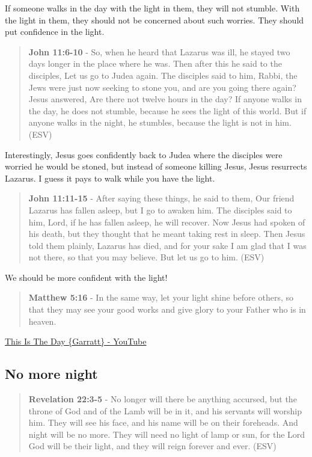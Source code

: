 \documentclass[11pt]{article}
\begin{document}
If someone walks in the day with the light in them, they will not stumble.
With the light in them, they should not be concerned about such worries.
They should put confidence in the light.

\begin{quote}
\textbf{John 11:6-10} - So, when he heard that Lazarus was ill, he stayed two days longer in the place where he was. Then after this he said to the disciples, Let us go to Judea again. The disciples said to him, Rabbi, the Jews were just now seeking to stone you, and are you going there again? Jesus answered, Are there not twelve hours in the day? If anyone walks in the day, he does not stumble, because he sees the light of this world. But if anyone walks in the night, he stumbles, because the light is not in him. (ESV)
\end{quote}

Interestingly, Jesus goes confidently back to Judea where the disciples were worried he would be stoned, but instead of someone killing Jesus, Jesus resurrects Lazarus. I guess it pays to walk while you have the light.

\begin{quote}
\textbf{John 11:11-15} - After saying these things, he said to them, Our friend Lazarus has fallen asleep, but I go to awaken him. The disciples said to him, Lord, if he has fallen asleep, he will recover. Now Jesus had spoken of his death, but they thought that he meant taking rest in sleep. Then Jesus told them plainly, Lazarus has died, and for your sake I am glad that I was not there, so that you may believe. But let us go to him. (ESV)
\end{quote}

We should be more confident with the light!

\begin{quote}
\textbf{Matthew 5:16} - In the same way, let your light shine before others, so that they may see your good works and give glory to your Father who is in heaven.
\end{quote}

\href{https://www.youtube.com/watch?v=T9Eqm8uIuck}{This Is The Day \{Garratt\} - YouTube}

\subsection{No more night}
\label{sec:org6a06e9b}

\begin{quote}
\textbf{Revelation 22:3-5} -  No longer will there be anything accursed, but the throne of God and of the Lamb will be in it, and his servants will worship him.  They will see his face, and his name will be on their foreheads.  And night will be no more.  They will need no light of lamp or sun, for the Lord God will be their light, and they will reign forever and ever. (ESV)
\end{quote}
\end{document}
